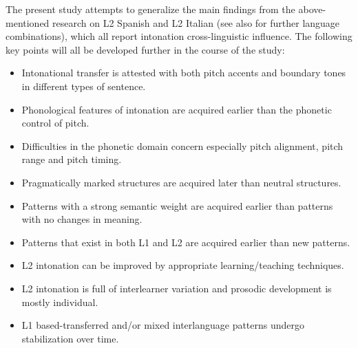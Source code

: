 The present study attempts to generalize the main findings from the above-mentioned research on L2 Spanish and L2 Italian (see also \citealt{Mennen2007,Mennen2015} for further language combinations), which all report intonation cross-linguistic influence. The following key points will all be developed further in the course of the study:


\begin{itemize}
\sloppy
\item Intonational transfer is attested with both pitch accents and boundary tones in different types of sentence.

\item Phonological features of intonation are acquired earlier than the phonetic control of pitch.

\item Difficulties in the phonetic domain concern especially pitch alignment, pitch range and pitch timing.

\item Pragmatically marked structures are acquired later than neutral structures.

\item Patterns with a strong semantic weight are acquired earlier than patterns with no changes in meaning.

\item Patterns that exist in both L1 and L2 are acquired earlier than new patterns.

\item L2 intonation can be improved by appropriate learning\slash teaching techniques.

\item L2 intonation is full of interlearner variation and prosodic development is mostly individual.

\item L1 based-transferred and/or mixed interlanguage patterns undergo stabilization over time.
\end{itemize}

